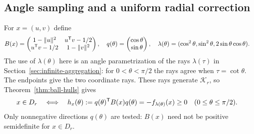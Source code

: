 \subsection{Angle sampling and a uniform radial correction}

For $x=(u,v)$ define
\[
 B(x)=\begin{pmatrix}
 1-\|u\|^2&u^{\mathsf T} v-1/2\\
 u^{\mathsf T} v-1/2&1-\|v\|^2
 \end{pmatrix},\quad
 q(\theta)=\begin{pmatrix}\cos\theta\\\sin\theta\end{pmatrix},\quad
 \lambda(\theta)=(\cos^2\theta,\sin^2\theta,2\sin\theta\cos\theta).
\]
The use of $\lambda(\theta)$ here is an angle parametrization of the
rays $\lambda(\tau)$ in Section~\ref{sec:infinite-aggregation}:
for $0<\theta<\pi/2$ the rays agree when $\tau=\cot\theta$.
The endpoints give the two coordinate rays. These rays generate
$\mathcal K_r$, so Theorem~\ref{thm:ball-hulls} gives
\begin{equation}\label{eq:angle-hull}
 x\in D_r\quad\Longleftrightarrow\quad
 h_x(\theta):=q(\theta)^{\mathsf T} B(x)q(\theta)
 =-f_{\lambda(\theta)}(x)\geq0
 \quad(0\leq\theta\leq\pi/2).
\end{equation}
Only nonnegative directions $q(\theta)$ are tested: $B(x)$ need not
be positive semidefinite for $x\in D_r$.

